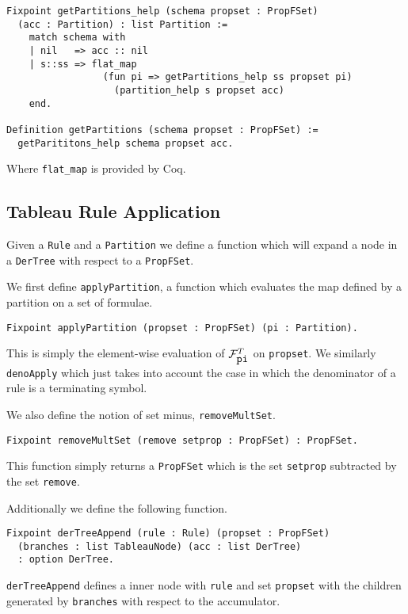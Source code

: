 \documentclass{llncs}
\begin{document}
\begin{verbatim}
Fixpoint getPartitions_help (schema propset : PropFSet)
  (acc : Partition) : list Partition :=
    match schema with
    | nil   => acc :: nil
    | s::ss => flat_map
                 (fun pi => getPartitions_help ss propset pi) 
                   (partition_help s propset acc)
    end.

Definition getPartitions (schema propset : PropFSet) :=
  getParititons_help schema propset acc.
\end{verbatim}

Where \verb+flat_map+ is provided by Coq.

\subsection{Tableau Rule Application}

Given a \verb+Rule+ and a \verb+Partition+ we define a function which will
expand a node in a \verb+DerTree+ with respect to a \verb+PropFSet+.

We first define \verb+applyPartition+, a function which evaluates the map
defined by a partition on a set of formulae.

\begin{verbatim}
Fixpoint applyPartition (propset : PropFSet) (pi : Partition).
\end{verbatim}

This is simply the element-wise evaluation of $\mathcal{F}_{\verb+pi+}^{T}$ on
\verb+propset+. We similarly \verb+denoApply+ which just takes into account the
case in which the denominator of a rule is a terminating symbol.

We also define the notion of set minus, \verb+removeMultSet+.

\begin{verbatim}
Fixpoint removeMultSet (remove setprop : PropFSet) : PropFSet.
\end{verbatim}

This function simply returns a \verb+PropFSet+ which is the set \verb+setprop+
subtracted by the set \verb+remove+.

Additionally we define the following function.

\begin{verbatim}
Fixpoint derTreeAppend (rule : Rule) (propset : PropFSet)
  (branches : list TableauNode) (acc : list DerTree)
  : option DerTree.
\end{verbatim}

\verb+derTreeAppend+ defines a inner node with \verb+rule+ and set
\verb+propset+ with the children generated by \verb+branches+ with respect to
the accumulator.
\end{document}
